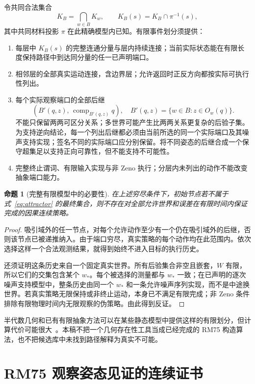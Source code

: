 \documentclass[11pt,a4paper]{article}
\theoremstyle{cn}
\newtheorem{proposition}[theorem]{命题}
\begin{document}
令共同合法集合
\[
K_B=\bigcap_{w\in B}K_w,\qquad
K_B(s)=K_B\cap\pi^{-1}(s),
\]
其中共同材料投影 \(\pi\) 在此精确模型内已知。有限事件划分须提供：

\begin{enumerate}
\item 每层中 \(K_B(s)\) 的完整连通分量与层内持续连接；当前实际状态能在有限长度保持路径中到达同分量的任一已声明端口。
\item 相邻层的全部真实运动连接，含边界层；允许返回时正反方向都按实际可执行性列出。
\item 每个实际观察端口的全部后继
\[
\left(B'(q,z),\,\operatorname{comp}_{B'(q,z)}q\right),
\quad
B'(q,z)=\{w\in B:z\in O_w(q)\}.
\]
不能只保留两两可区分关系；多世界可能产生比两两关系更复杂的后验子集。为支持逆向结论，每一个列出后继都必须由当前所选的同一个实际端口及其噪声支持实现；签名不同的实际端口应分别保留。将不同姿态的后继合成一个保守超集足以支持正向可靠性，但不能支持不可能性。
\item 完整终止谓词、有限输入实现与非 Zeno 执行；分层内未列出的动作不能改变抽象端口能力。
\end{enumerate}

\begin{proposition}[完整有限模型中的必要性]
在上述穷尽条件下，初始节点若不属于式~\eqref{eq:attractor} 的最终集合，则不存在对全部允许世界和误差在有限时间内保证完成的因果连续策略。
\end{proposition}

\begin{proof}
吸引域外的任一节点，对每个允许动作至少有一个仍在吸引域外的后继，否则该节点已被递推纳入。由于端口穷尽，真实策略的每个动作均在此范围内。依次选择这样一个合法观测结果，就得到始终不进入目标的执行历史。

还须证明这条历史来自一个固定真实世界。所有后验集合非空且嵌套，\(W\) 有限，所以它们的交集包含某个 \(w_*\)。每个被选择的测量都与 \(w_*\) 一致；在已声明的逐次噪声支持模型中，整条历史由同一个 \(w_*\) 和一条允许噪声序列实现，而不是中途换世界。若真实策略无限保持或非终止运动，本身已不满足有限完成；非 Zeno 条件排除有限物理时间内无限观察的伪策略。由此得到反证。
\end{proof}

半代数几何和已有有限抽象方法可以在某些静态模型中提供这样的有限划分，但计算代价可能很大~\cite{output}。本稿不把一个几何存在性工具当成已经完成的 RM75 构造算法，也不把候选库中未找到路径解释为真实不可能。


\section{RM75 观察姿态见证的连续证书}
\label{app:rm75}
\end{document}
